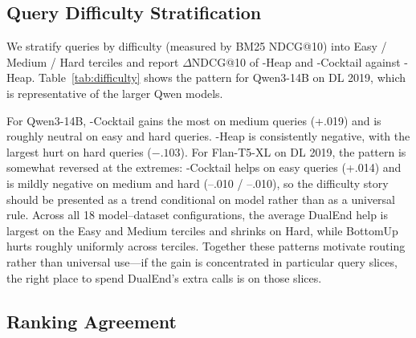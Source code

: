 \subsection{Query Difficulty Stratification}
\label{sec:difficulty}

We stratify queries by difficulty (measured by BM25 NDCG@10) into Easy / Medium / Hard terciles and report $\Delta$NDCG@10 of \bottomup{}-Heap and \dualend{}-Cocktail against \topdown{}-Heap. Table~\ref{tab:difficulty} shows the pattern for Qwen3-14B on DL 2019, which is representative of the larger Qwen models.

\begin{table}[!htbp]
\caption{$\Delta$NDCG@10 vs.\ \topdown{}-Heap, stratified by BM25 difficulty terciles (Qwen3-14B, DL 2019, 43 queries). \dualend{}-Cocktail helps most on Medium and Hard queries; \bottomup{}-Heap hurts most on Hard queries.}
\label{tab:difficulty}
\small
{}
\end{table}

For Qwen3-14B, \dualend{}-Cocktail gains the most on medium queries (+.019) and is roughly neutral on easy and hard queries. \bottomup{}-Heap is consistently negative, with the largest hurt on hard queries ($-.103$). For Flan-T5-XL on DL 2019, the pattern is somewhat reversed at the extremes: \dualend{}-Cocktail helps on easy queries (+.014) and is mildly negative on medium and hard (--.010 / --.010), so the difficulty story should be presented as a trend conditional on model rather than as a universal rule. Across all 18 model--dataset configurations, the average DualEnd help is largest on the Easy and Medium terciles and shrinks on Hard, while BottomUp hurts roughly uniformly across terciles. Together these patterns motivate routing rather than universal use---if the gain is concentrated in particular query slices, the right place to spend DualEnd's extra calls is on those slices.


\subsection{Ranking Agreement}
\label{sec:agreement}

